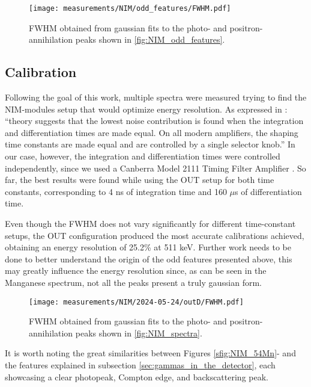 \begin{figure}[H]
  \centering
  \texttt{[image: measurements/NIM/odd\_features/FWHM.pdf]}
  \caption{\label{fig:NIM_odd_FWHM}FWHM obtained from gaussian fits to the photo- and positron-annihilation peaks shown in \ref{fig:NIM_odd_features}.}
\end{figure}

\subsection{Calibration}

Following the goal of this work, multiple spectra were measured trying to find the NIM-modules setup that would optimize energy resolution. As expressed in \cite[sec.~4.4.3]{gilmore2008practical}: ``theory suggests that the lowest noise contribution is found when the integration and differentiation times are made equal. On all modern amplifiers, the shaping time constants are made equal and are controlled by a single selector knob.'' In our case, however, the integration and differentiation times were controlled independently, since we used a Canberra Model 2111 Timing Filter Amplifier \cite{CanberraTFA}. So far, the best results were found while using the OUT setup for both time constants, corresponding to 4 ns of integration time and 160 $\mu$s of differentiation time. 

Even though the FWHM does not vary significantly for different time-constant setups, the OUT configuration produced the most accurate calibrations achieved, obtaining an energy resolution of 25.2\% at 511 keV. Further work needs to be done to better understand the origin of the odd features presented above, this may greatly influence the energy resolution since, as can be seen in the Manganese spectrum, not all the peaks present a truly gaussian form.

\begin{figure}[H]
  \centering
  \texttt{[image: measurements/NIM/2024-05-24/outD/FWHM.pdf]}
  \caption{\label{fig:NIM_FWHM}FWHM obtained from gaussian fits to the photo- and positron-annihilation peaks shown in \ref{fig:NIM_spectra}.}
\end{figure}

It is worth noting the great similarities between Figures \ref{sfig:NIM_54Mn}- and the features explained in subsection \ref{sec:gammas_in_the_detector}, each showcasing a clear photopeak, Compton edge, and backscattering peak.

